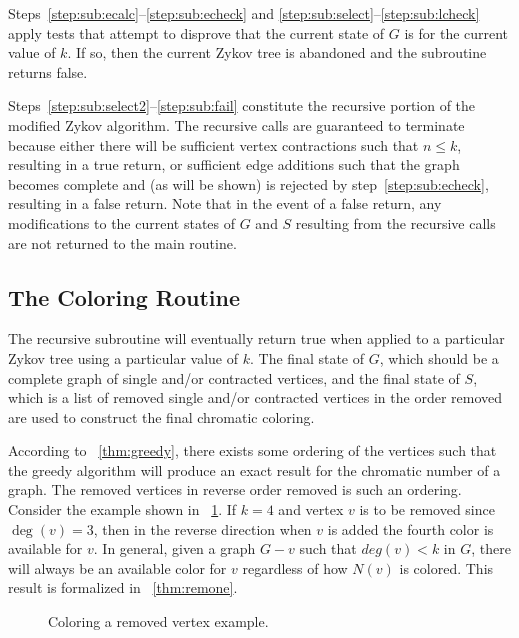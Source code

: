 Steps~\ref{step:sub:ecalc}--\ref{step:sub:echeck} and \ref{step:sub:select}--\ref{step:sub:lcheck} apply tests
that attempt to disprove that the current state of \(G\) is  for the current value of \(k\).  If so,
then the current Zykov tree is abandoned and the subroutine returns false.

Steps~\ref{step:sub:select2}--\ref{step:sub:fail} constitute the recursive portion of the modified Zykov algorithm.
The recursive calls are guaranteed to terminate because either there will be sufficient vertex contractions such
that \(n\le k\), resulting in a true return, or sufficient edge additions such that the graph becomes complete and
(as will be shown) is rejected by step~\ref{step:sub:echeck}, resulting in a false return.  Note that in the event
of a false return, any modifications to the current states of \(G\) and \(S\) resulting from the recursive calls
are not returned to the main routine.

\subsection{The Coloring Routine}\label{sec:sub:coloring}

The recursive subroutine will eventually return true when applied to a particular Zykov tree using a particular
value of \(k\).  The final state of \(G\), which should be a complete graph of single and/or contracted vertices,
and the final state of \(S\), which is a list of removed single and/or contracted vertices in the order removed are
used to construct the final chromatic coloring.

According to \theoremname~\ref{thm:greedy}, there exists some ordering of the vertices such that the greedy algorithm
will produce an exact result for the chromatic number of a graph.  The removed vertices in reverse order removed is
such an ordering.  Consider the example shown in \figurename~\ref{fig:reverse}.  If \(k=4\) and vertex \(v\) is to
be removed since \(\deg(v)=3\), then in the reverse direction when \(v\) is added the fourth color is available for
\(v\).  In general, given a graph \(G-v\) such that \(deg(v)<k\) in \(G\), there will always be an available color
for \(v\) regardless of how \(N(v)\) is colored.  This result is formalized in \theoremname~\ref{thm:remone}.

\begin{figure}[H]
  \centering
  \caption{Coloring a removed vertex example.}
  \label{fig:reverse}
\end{figure}

